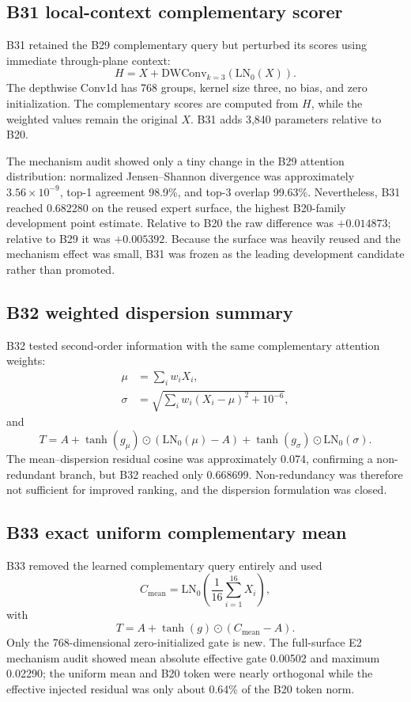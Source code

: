 \documentclass[preprint,12pt]{elsarticle}
\newcommand{\LNzero}{\mathrm{LN}_0}
\begin{document}
\subsection{B31 local-context complementary scorer}
B31 retained the B29 complementary query but perturbed its scores using immediate through-plane context:
\begin{equation}
H=X+\mathrm{DWConv}_{k=3}(\LNzero(X)).
\end{equation}
The depthwise Conv1d has 768 groups, kernel size three, no bias, and zero initialization. The complementary scores are computed from $H$, while the weighted values remain the original $X$. B31 adds 3,840 parameters relative to B20.

The mechanism audit showed only a tiny change in the B29 attention distribution: normalized Jensen--Shannon divergence was approximately $3.56\times10^{-9}$, top-1 agreement 98.9\%, and top-3 overlap 99.63\%. Nevertheless, B31 reached 0.682280 on the reused expert surface, the highest B20-family development point estimate. Relative to B20 the raw difference was $+0.014873$; relative to B29 it was $+0.005392$. Because the surface was heavily reused and the mechanism effect was small, B31 was frozen as the leading development candidate rather than promoted.

\subsection{B32 weighted dispersion summary}
B32 tested second-order information with the same complementary attention weights:
\begin{align}
\mu&=\sum_iw_iX_i,\\
\sigma&=\sqrt{\sum_iw_i(X_i-\mu)^2+10^{-6}},
\end{align}
and
\begin{equation}
T=A+\tanh(g_\mu)\odot(\LNzero(\mu)-A)
+\tanh(g_\sigma)\odot\LNzero(\sigma).
\end{equation}
The mean--dispersion residual cosine was approximately 0.074, confirming a non-redundant branch, but B32 reached only 0.668699. Non-redundancy was therefore not sufficient for improved ranking, and the dispersion formulation was closed.

\subsection{B33 exact uniform complementary mean}
B33 removed the learned complementary query entirely and used
\begin{equation}
C_{\mathrm{mean}}=\LNzero\!\left(\frac{1}{16}\sum_{i=1}^{16}X_i\right),
\end{equation}
with
\begin{equation}
T=A+\tanh(g)\odot(C_{\mathrm{mean}}-A).
\label{eq:b33}
\end{equation}
Only the 768-dimensional zero-initialized gate is new. The full-surface E2 mechanism audit showed mean absolute effective gate 0.00502 and maximum 0.02290; the uniform mean and B20 token were nearly orthogonal while the effective injected residual was only about 0.64\% of the B20 token norm.
\end{document}
